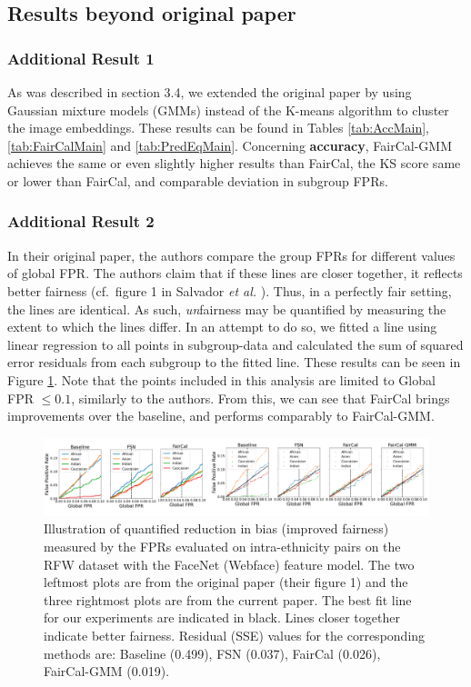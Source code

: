 \subsection{Results beyond original paper}

\subsubsection{Additional Result 1}
As was described in section 3.4, we extended the original paper by using Gaussian mixture models (GMMs) instead of the K-means algorithm to cluster the image embeddings. These results can be found in Tables \ref{tab:AccMain}, \ref{tab:FairCalMain} and \ref{tab:PredEqMain}. Concerning \textcolor{Emerald}{\textbf{accuracy}}, FairCal-GMM achieves the same or even slightly higher results than FairCal, the KS score same or lower than FairCal, and comparable deviation in subgroup FPRs.

\subsubsection{Additional Result 2}
In their original paper, the authors compare the group FPRs for different values of global FPR. The authors claim that if these lines are closer together, it reflects better fairness (cf.\ figure 1 in Salvador \textit{et al.} \citep{2106.03761}). Thus, in a perfectly fair setting, the lines are identical. As such, \textit{un}fairness may be quantified by measuring the extent to which the lines differ. In an attempt to do so, we fitted a line using linear regression to all points in subgroup-data and calculated the sum of squared error residuals from each subgroup to the fitted line. These results can be seen in Figure \ref{fig:residuals}. Note that the points included in this analysis are limited to Global FPR $\leq0.1$, similarly to the authors. From this, we can see that FairCal brings improvements over the baseline, and performs comparably to FairCal-GMM. 

\begin{figure}[h]
\includegraphics[width=\linewidth]{images_and_figures/fairness_plots.png}
\caption{Illustration of quantified reduction in bias (improved fairness) measured by the FPRs evaluated on intra-ethnicity pairs on the RFW dataset with the FaceNet (Webface) feature model. The two leftmost plots are from the original paper (their figure 1) and the three rightmost plots are from the current paper. The best fit line for our experiments are indicated in black. Lines closer together indicate better fairness. Residual (SSE) values for the corresponding methods are: Baseline (0.499), FSN (0.037), FairCal (0.026), FairCal-GMM (0.019).}
\centering
\label{fig:residuals}
\end{figure}

